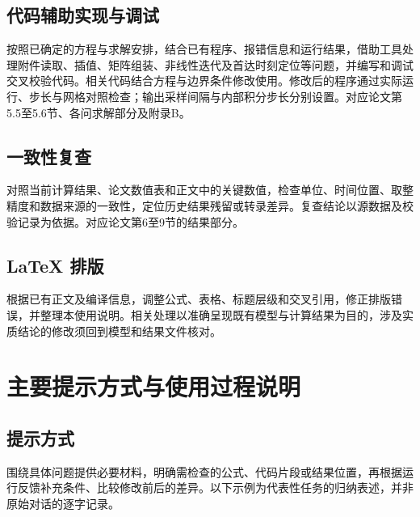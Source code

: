 \documentclass[withoutpreface,bwprint]{commons/cumcmthesis}
\begin{document}
\subsection{代码辅助实现与调试}
按照已确定的方程与求解安排，结合已有程序、报错信息和运行结果，借助工具处理附件读取、插值、矩阵组装、非线性迭代及首达时刻定位等问题，并编写和调试交叉校验代码。相关代码结合方程与边界条件修改使用。修改后的程序通过实际运行、步长与网格对照检查；输出采样间隔与内部积分步长分别设置。对应论文第5.5至5.6节、各问求解部分及附录B。

\subsection{一致性复查}
对照当前计算结果、论文数值表和正文中的关键数值，检查单位、时间位置、取整精度和数据来源的一致性，定位历史结果残留或转录差异。复查结论以源数据及校验记录为依据。对应论文第6至9节的结果部分。

\subsection{LaTeX 排版}
根据已有正文及编译信息，调整公式、表格、标题层级和交叉引用，修正排版错误，并整理本使用说明。相关处理以准确呈现既有模型与计算结果为目的，涉及实质结论的修改须回到模型和结果文件核对。

\section{主要提示方式与使用过程说明}
\subsection{提示方式}
围绕具体问题提供必要材料，明确需检查的公式、代码片段或结果位置，再根据运行反馈补充条件、比较修改前后的差异。以下示例为代表性任务的归纳表述，并非原始对话的逐字记录。
\end{document}
